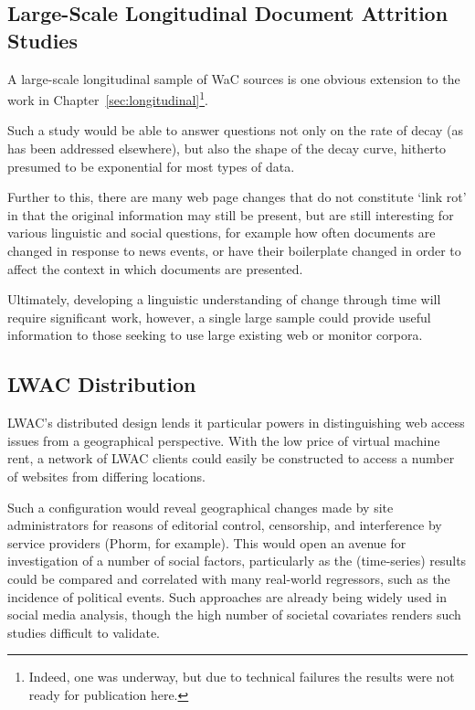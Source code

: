 %





\subsection{Large-Scale Longitudinal Document Attrition Studies}
A large-scale longitudinal sample of WaC sources is one obvious extension to the work in Chapter~\ref{sec:longitudinal}\footnote{Indeed, one was underway, but due to technical failures the results were not ready for publication here.}.

Such a study would be able to answer questions not only on the rate of decay (as has been addressed elsewhere), but also the shape of the decay curve, hitherto presumed to be exponential for most types of data.

Further to this, there are many web page changes that do not constitute `link rot' in that the original information may still be present, but are still interesting for various linguistic and social questions, for example how often documents are changed in response to news events, or have their boilerplate changed in order to affect the context in which documents are presented.

Ultimately, developing a linguistic understanding of change through time will require significant work, however, a single large sample could provide useful information to those seeking to use large existing web or monitor corpora.

\subsection{LWAC Distribution}
LWAC's distributed design lends it particular powers in distinguishing web access issues from a geographical perspective.  With the low price of virtual machine rent, a network of LWAC clients could easily be constructed to access a number of websites from differing locations.

Such a configuration would reveal geographical changes made by site administrators for reasons of editorial control, censorship, and interference by service providers (Phorm\cite{clayton2008phorm}, for example).  This would open an avenue for investigation of a number of social factors, particularly as the (time-series) results could be compared and correlated with many real-world regressors, such as the incidence of political events.  Such approaches are already being widely used in social media analysis\cite{achrekar2011predicting,bollen2011twitter}, though the high number of societal covariates renders such studies difficult to validate.


